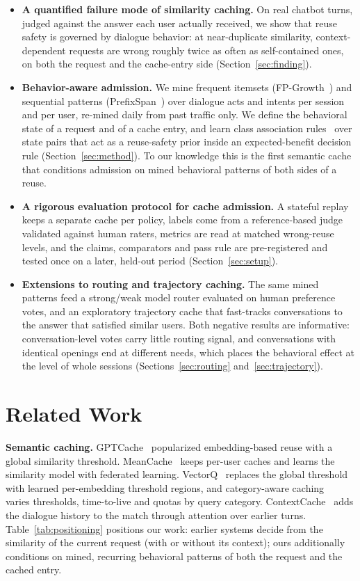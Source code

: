 \documentclass[conference]{IEEEtran}
\begin{document}
\begin{itemize}
\item \textbf{A quantified failure mode of similarity caching.} On \nTurns{} real chatbot turns, judged against the answer each user actually received, we show that reuse safety is governed by dialogue behavior: at near-duplicate similarity, context-dependent requests are wrong roughly twice as often as self-contained ones, on both the request and the cache-entry side (Section~\ref{sec:finding}).
\item \textbf{Behavior-aware admission.} We mine frequent itemsets (FP-Growth~\cite{han2000fpgrowth}) and sequential patterns (PrefixSpan~\cite{pei2001prefixspan}) over dialogue acts and intents per session and per user, re-mined daily from past traffic only. We define the behavioral state of a request and of a cache entry, and learn class association rules~\cite{liu1998cba} over state pairs that act as a reuse-safety prior inside an expected-benefit decision rule (Section~\ref{sec:method}). To our knowledge this is the first semantic cache that conditions admission on mined behavioral patterns of both sides of a reuse.
\item \textbf{A rigorous evaluation protocol for cache admission.} A stateful replay keeps a separate cache per policy, labels come from a reference-based judge validated against human raters, metrics are read at matched wrong-reuse levels, and the claims, comparators and pass rule are pre-registered and tested once on a later, held-out period (Section~\ref{sec:setup}).
\item \textbf{Extensions to routing and trajectory caching.} The same mined patterns feed a strong/weak model router evaluated on human preference votes, and an exploratory trajectory cache that fast-tracks conversations to the answer that satisfied similar users. Both negative results are informative: conversation-level votes carry little routing signal, and conversations with identical openings end at different needs, which places the behavioral effect at the level of whole sessions (Sections~\ref{sec:routing} and~\ref{sec:trajectory}).
\end{itemize}

\section{Related Work}
\label{sec:related}
\textbf{Semantic caching.} GPTCache~\cite{bang2023gptcache} popularized embedding-based reuse with a global similarity threshold. MeanCache~\cite{gill2025meancache} keeps per-user caches and learns the similarity model with federated learning. VectorQ~\cite{schroeder2025vectorq} replaces the global threshold with learned per-embedding threshold regions, and category-aware caching~\cite{wang2025category} varies thresholds, time-to-live and quotas by query category. ContextCache~\cite{yan2025contextcache} adds the dialogue history to the match through attention over earlier turns. Table~\ref{tab:positioning} positions our work: earlier systems decide from the similarity of the current request (with or without its context); ours additionally conditions on mined, recurring behavioral patterns of both the request and the cached entry.
\end{document}
